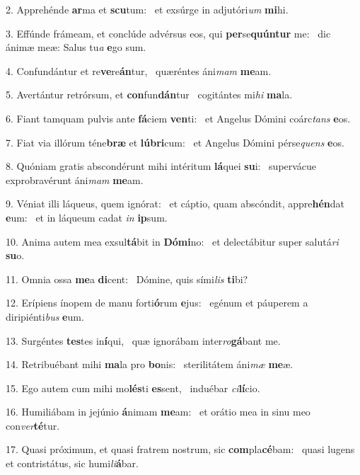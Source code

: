 2. Apprehénde \textbf{ar}ma et \textbf{scu}tum: \ast\  et exsúrge in adjutóri\textit{um} \textbf{mi}hi.\

3. Effúnde frámeam, et conclúde advérsus eos, qui \textbf{per}se\textbf{quún}\textbf{tur} me: \ast\  dic ánimæ meæ: Salus tu\textit{a} \textbf{e}go sum.\

4. Confundántur et re\textbf{ve}re\textbf{án}tur, \ast\  quæréntes áni\textit{mam} \textbf{me}am.\

5. Avertántur retrórsum, et \textbf{con}fun\textbf{dán}tur \ast\  cogitántes mi\textit{hi} \textbf{ma}la.\

6. Fiant tamquam pulvis ante \textbf{fá}ciem \textbf{ven}ti: \ast\  et Angelus Dómini coárc\textit{tans} \textbf{e}os.\

7. Fiat via illórum téne\textbf{bræ} et \textbf{lú}\textbf{bri}cum: \ast\  et Angelus Dómini pérse\textit{quens} \textbf{e}os.\

8. Quóniam gratis abscondérunt mihi intéritum \textbf{lá}quei \textbf{su}i: \ast\  supervácue exprobravérunt áni\textit{mam} \textbf{me}am.\

9. Véniat illi láqueus, quem ignórat: \dag\  et cáptio, quam abscóndit, appre\textbf{hén}dat \textbf{e}um: \ast\  et in láqueum cadat \textit{in} \textbf{ip}sum.\

10. Anima autem mea exsul\textbf{tá}bit in \textbf{Dó}\textbf{mi}no: \ast\  et delectábitur super salutá\textit{ri} \textbf{su}o.\

11. Omnia ossa \textbf{me}a \textbf{di}cent: \ast\  Dómine, quis sími\textit{lis} \textbf{ti}bi?\

12. Erípiens ínopem de manu forti\textbf{ó}rum \textbf{e}jus: \ast\  egénum et páuperem a diripiénti\textit{bus} \textbf{e}um.\

13. Surgéntes \textbf{tes}tes in\textbf{í}qui, \ast\  quæ ignorábam inter\textit{ro}\textbf{gá}bant me.\

14. Retribuébant mihi \textbf{ma}la pro \textbf{bo}nis: \ast\  sterilitátem áni\textit{mæ} \textbf{me}æ.\

15. Ego autem cum mihi mo\textbf{lés}ti \textbf{es}sent, \ast\  induébar \textit{ci}\textbf{lí}cio.\

16. Humiliábam in jejúnio \textbf{á}nimam \textbf{me}am: \ast\  et orátio mea in sinu meo con\textit{ver}\textbf{té}tur.\

17. Quasi próximum, et quasi fratrem nostrum, sic \textbf{com}pla\textbf{cé}bam: \ast\  quasi lugens et contristátus, sic humi\textit{li}\textbf{á}bar.\

